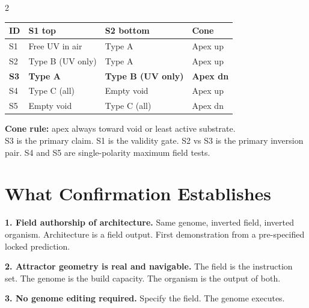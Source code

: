 \documentclass[8pt, a4paper]{article}
\begin{document}
\begin{multicols}{2}
{\vspace{0.2em}
\begin{tabular}{p{0.5cm}p{1.85cm}p{1.85cm}p{0.85cm}}
\toprule
\textbf{ID} & \textbf{S1 top} & \textbf{S2 bottom} & \textbf{Cone} \\
\midrule
S1 & Free UV in air & Type A & Apex up \\[0.1em]
S2 & Type B (UV only) & Type A & Apex up \\[0.1em]
\textbf{S3} & \textbf{Type A} & \textbf{Type B (UV only)} & \textbf{Apex dn} \\[0.1em]
S4 & Type C (all) & Empty void & Apex up \\[0.1em]
S5 & Empty void & Type C (all) & Apex dn \\
\bottomrule
\end{tabular}

\vspace{0.1em}
\textbf{Cone rule:} apex always toward void or least active substrate.\\
S3 is the primary claim. S1 is the validity gate.
S2 vs S3 is the primary inversion pair.
S4 and S5 are single-polarity maximum field tests.
}

\section{What Confirmation Establishes}
{\small
\textbf{1. Field authorship of architecture.}
Same genome, inverted field, inverted organism.
Architecture is a field output. First demonstration from a
pre-specified locked prediction.

\textbf{2. Attractor geometry is real and navigable.}
The field is the instruction set. The genome is the build capacity.
The organism is the output of both.

\textbf{3. No genome editing required.}
Specify the field. The genome executes.
}


\end{multicols}
\end{document}
